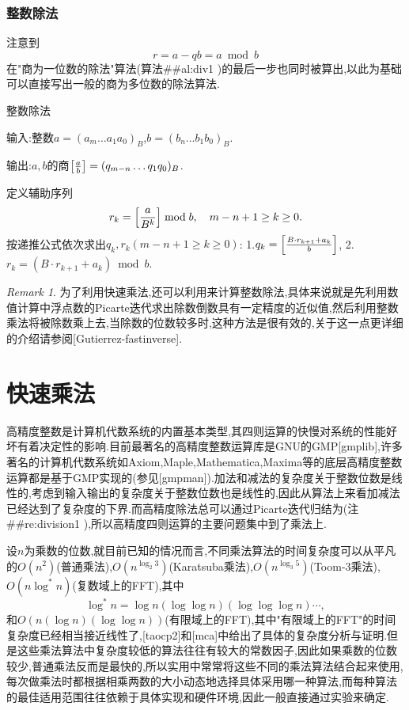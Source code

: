 \documentclass{ctexart}
\newcommand\mtcasCite[1]{[#1]}
\theoremstyle{remark}
\newtheorem{remark}{Remark}
\theoremstyle{definition}
\begin{document}
\subsubsection{整数除法}

注意到$$r=a-qb=a\bmod b$$在"商为一位数的除法"算法(算法##al:div1
)的最后一步也同时被算出,以此为基础可以直接写出一般的商为多位数的除法算法.
\begin{algorithm}{整数除法}\label{al:division2}

输入:整数$a=(a_m\ldots a_1a_0)_B$,$b=(b_n\ldots b_1b_0)_B$.

输出:$a,b$的商$\left[{a\over b}\right]=(q_{m-n}\ldots q_1q_0)_B$.

定义辅助序列$$r_k=\left[{a\over B^k}\right]\bmod b,\quad m-n+1\ge k\ge 0.$$
按递推公式依次求出$q_k,r_k(m-n+1\ge k\ge 0)$:
 1.$q_k=\left[{B\cdot r_{k+1}+a_k\over b}\right]$,
 2.$r_k=(B\cdot r_{k+1}+a_k)\bmod b$.
\end{algorithm}
\begin{remark}\label{re:division1}
为了利用快速乘法,还可以利用来计算整数除法,具体来说就是先利用数值计算中浮点数的Picarte迭代求出除数倒数具有一定精度的近似值,然后利用整数乘法将被除数乘上去,当除数的位数较多时,这种方法是很有效的,关于这一点更详细的介绍请参阅\mtcasCite{Gutierrez-fastinverse}.
\end{remark}

\section{快速乘法}

高精度整数是计算机代数系统的内置基本类型,其四则运算的快慢对系统的性能好坏有着决定性的影响.目前最著名的高精度整数运算库是GNU的GMP\mtcasCite{gmplib},许多著名的计算机代数系统如Axiom,Maple,Mathematica,Maxima等的底层高精度整数运算都是基于GMP实现的(参见\mtcasCite{gmpman}).加法和减法的复杂度关于整数位数是线性的,考虑到输入输出的复杂度关于整数位数也是线性的,因此从算法上来看加减法已经达到了复杂度的下界.而高精度除法总可以通过Picarte迭代归结为(注##re:division1
),所以高精度四则运算的主要问题集中到了乘法上.

设$n$为乘数的位数,就目前已知的情况而言,不同乘法算法的时间复杂度可以从平凡的$O(n^2)$(普通乘法),$O(n^{\log_2{3}})$(Karatsuba乘法),$O(n^{\log_3{5}})$(Toom-3乘法),$O(n\log^*{n})$(复数域上的FFT),其中$$\log^*{n}=\log{n}(\log{\log{n}})(\log{\log{\log{n}}})\cdots,$$和$O(n(\log{n})(\log{\log{n}}))$(有限域上的FFT),其中"有限域上的FFT"的时间复杂度已经相当接近线性了,\mtcasCite{taocp2}和\mtcasCite{mca}中给出了具体的复杂度分析与证明.但是这些乘法算法中复杂度较低的算法往往有较大的常数因子,因此如果乘数的位数较少,普通乘法反而是最快的,所以实用中常常将这些不同的乘法算法结合起来使用,每次做乘法时都根据相乘两数的大小动态地选择具体采用哪一种算法,而每种算法的最佳适用范围往往依赖于具体实现和硬件环境,因此一般直接通过实验来确定.
\end{document}
